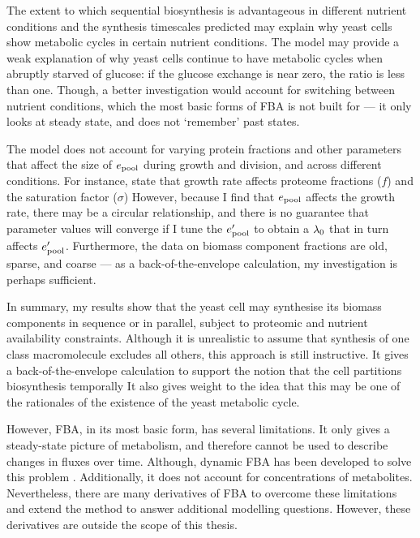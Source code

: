 The extent to which sequential biosynthesis is advantageous in different nutrient conditions and the synthesis timescales predicted may explain why yeast cells show metabolic cycles in certain nutrient conditions.
The model may provide a weak explanation of why yeast cells continue to have metabolic cycles when abruptly starved of glucose: if the glucose exchange is near zero, the ratio is less than one.
Though, a better investigation would account for switching between nutrient conditions, which the most basic forms of FBA is not built for --- it only looks at steady state, and does not `remember' past states.

The model does not account for varying protein fractions and other parameters that affect the size of $e_{\mathrm{pool}}$ during growth and division, and across different conditions.
For instance, \textcite{elsemmanWholecellModelingYeast2022} state that growth rate affects proteome fractions ($f$) and the saturation factor ($\sigma$)
However, because I find that $e_{\mathrm{pool}}$ affects the growth rate, there may be a circular relationship, and there is no guarantee that parameter values will converge if I tune the $e_{\mathrm{pool}}^{\prime}$ to obtain a $\lambda_{0}$ that in turn affects $e_{\mathrm{pool}}^{\prime}$.
Furthermore, the data on biomass component fractions are old, sparse, and coarse --- as a back-of-the-envelope calculation, my investigation is perhaps sufficient.

In summary, my results show that the yeast cell may synthesise its biomass components in sequence or in parallel, subject to proteomic and nutrient availability constraints.
Although it is unrealistic to assume that synthesis of one class macromolecule excludes all others, this approach is still instructive.
It gives a back-of-the-envelope calculation to support the notion that the cell partitions biosynthesis temporally
It also gives weight to the idea that this may be one of the rationales of the existence of the yeast metabolic cycle.


However, FBA, in its most basic form, has several limitations.
It only gives a steady-state picture of metabolism, and therefore cannot be used to describe changes in fluxes over time.
Although, dynamic FBA has been developed to solve this problem \parencite{mahadevanDynamicFluxBalance2002}.
Additionally, it does not account for concentrations of metabolites.
Nevertheless, there are many derivatives of FBA to overcome these limitations and extend the method to answer additional modelling questions.
However, these derivatives are outside the scope of this thesis.
